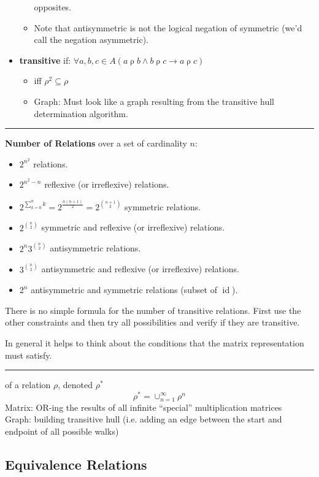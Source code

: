 \documentclass[a4paper]{extarticle}
\DeclareMathOperator{\id}{\text{id}}
\newcommand{\relrho}{\mathrel{\rho}}
\newcommand{\sep}{\vspace{5pt}\noindent\hrule\vspace{5pt}}
\begin{document}
\begin{multicols*}{2}
\begin{itemize}
\begin{itemize}
  	opposites.
  	\item Note that antisymmetric is not the logical negation of symmetric (we'd
  	call the negation asymmetric).
  \end{itemize}
  \item \textbf{transitive} if: \quad  $\forall a,b,c \in A (a\relrho b \land
  b\relrho c \rightarrow a\relrho c)$
  \begin{itemize}
    \item \Lem iff $\rho^2 \subseteq \rho$
    \item Graph: Must look like a graph resulting from the transitive hull
    determination algorithm.
  \end{itemize}
\end{itemize}

\sep

\textbf{Number of Relations} over a set of cardinality $n$:
\begin{itemize}
  \item $2^{n^2}$ relations.
  \item $2^{n^2-n}$ reflexive (or irreflexive) relations.
  \item $2^{\sum_{k=0}^n k}=2^{\frac{n(n+1)}{2}}=2^{\binom{n+1}{2}}$ symmetric
  relations.
    \item $2^{\binom{n}{2}}$ symmetric and reflexive (or irreflexive) relations.
  \item $2^n3^{\binom{n}{2}}$ antisymmetric relations.
  \item $3^{\binom{n}{2}}$ antisymmetric and reflexive (or irreflexive)
  relations.
  \item $2^n$ antisymmetric and symmetric relations (subset of $\id$). 
\end{itemize}

There is no simple formula for the number of transitive relations. First use the
other constraints and then try all possibilities and verify if they are transitive.

In general it helps to think about the conditions that the matrix
representation must satisfy.

\sep

 of a relation $\rho$, denoted $\rho^*$
\[
\rho^*=\cup_{n=1}^{\infty} \rho^n
\]
Matrix: OR-ing the results of all infinite ``special'' multiplication matrices\\
Graph: building transitive hull (i.e. adding an edge between the start and
endpoint of all possible walks)

\subsection{Equivalence Relations}


\end{multicols*}
\end{document}
